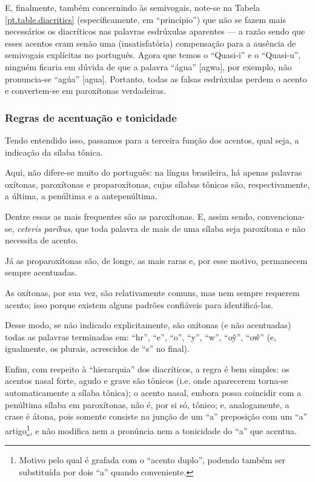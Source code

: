 \documentclass[12pt, a5paper, titlepage]{article}
\begin{document}
E, finalmente, também concernindo às semivogais, note-se na Tabela \ref{pt.table.diacritics} (especificamente, em ``princípio'') que não se fazem mais necessários os diacríticos nas palavras esdrúxulas aparentes --- a razão sendo que esses acentos eram senão uma (insatisfatória) compensação para a ausência de semivogais explícitas no português. Agora que temos o ``Quasi-i'' e o ``Quasi-u'', ninguém ficaria em dúvida de que a palavra ``água'' [\textprimstress agwa], por exemplo, não pronuncia-se ``agúa'' [a\textprimstress gua]. Portanto, todas as falsas esdrúxulas perdem o acento e convertem-se em paroxítonas verdadeiras.

\subsubsection{Regras de acentuação e tonicidade}
Tendo entendido isso, passamos para a terceira função dos acentos, qual seja, a indicação da sílaba tônica.

Aqui, não difere-se muito do português: na língua brasileira, há apenas palavras oxítonas, paroxítonas e proparoxítonas, cujas sílabas tônicas são, respectivamente, a última, a penúltima e a antepenúltima.

Dentre essas as mais frequentes são as paroxítonas. E, assim sendo, convenciona-se, \textit{ceteris paribus}, que toda palavra de mais de uma sílaba seja paroxítona e não necessita de acento.

Já as proparoxítonas são, de longe, as mais raras e, por esse motivo, permanecem sempre acentuadas.

As oxítonas, por sua vez, são relativamente comuns, mas nem sempre requerem acento; isso porque existem alguns padrões confiáveis para identificá-las.

Desse modo, se não indicado explicitamente, são oxítonas (e não acentuadas) todas as palavras terminadas em: ``hr'', ``e'', ``o'', ``y'', ``w'', ``o\~y'', ``o\~w'' (e, igualmente, os plurais, acrescidos de ``s'' no final).

Enfim, com respeito à ``hierarquia'' dos diacríticos, a regra é bem simples: os acentos nasal forte, agudo e grave são tônicos (i.e. onde aparecerem torna-se automaticamente a sílaba tônica); o acento nasal, embora possa coincidir com a penúltima sílaba em paroxítonas, não é, por si só, tônico; e, analogamente, a crase é átona, pois somente consiste na junção de um ``a'' preposição com um ``a'' artigo\footnote{
    Motivo pelo qual é grafada com o ``acento duplo'', podendo também ser substituída por dois ``a'' quando conveniente.
}, e não modifica nem a pronúncia nem a tonicidade do ``a'' que acentua.
\end{document}

